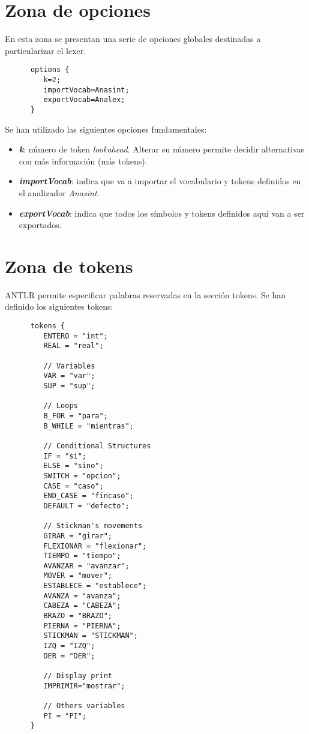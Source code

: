    \section{Zona de opciones}
   En esta zona se presentan una serie de opciones globales destinadas a particularizar el lexer.\\
   \begin{lstlisting}
      options {
         k=2;
         importVocab=Anasint;
         exportVocab=Analex;
      }
   \end{lstlisting}
   Se han utilizado las siguientes opciones fundamentales: 
   \begin{itemize}
      \item \textbf{\textit{k}}: número de token \textit{lookahead}. Alterar su número permite decidir alternativas con más información (más tokens).
      \item \textbf{\textit{importVocab}}: indica que va a importar el vocabulario y tokens definidos en el analizador \textit{Anasint}.
      \item \textbf{\textit{exportVocab}}: indica que todos los símbolos y tokens definidos aquí van a ser exportados. 
   \end{itemize}


   \section{Zona de tokens}
   ANTLR permite especificar palabras reservadas en la sección tokens. Se han definido los siguientes tokens:
   \begin{lstlisting}
      tokens {
         ENTERO = "int";
         REAL = "real";
      
         // Variables
         VAR = "var";
         SUP = "sup";
         
         // Loops
         B_FOR = "para"; 
         B_WHILE = "mientras";
         
         // Conditional Structures
         IF = "si";
         ELSE = "sino";
         SWITCH = "opcion";
         CASE = "caso";
         END_CASE = "fincaso";
         DEFAULT = "defecto"; 
      
         // Stickman's movements
         GIRAR = "girar";
         FLEXIONAR = "flexionar";
         TIEMPO = "tiempo";
         AVANZAR = "avanzar";
         MOVER = "mover";
         ESTABLECE = "establece";
         AVANZA = "avanza";
         CABEZA = "CABEZA";
         BRAZO = "BRAZO";
         PIERNA = "PIERNA";
         STICKMAN = "STICKMAN";
         IZQ = "IZQ";
         DER = "DER";
         
         // Display print
         IMPRIMIR="mostrar";
         
         // Others variables
         PI = "PI";
      }
   \end{lstlisting}


